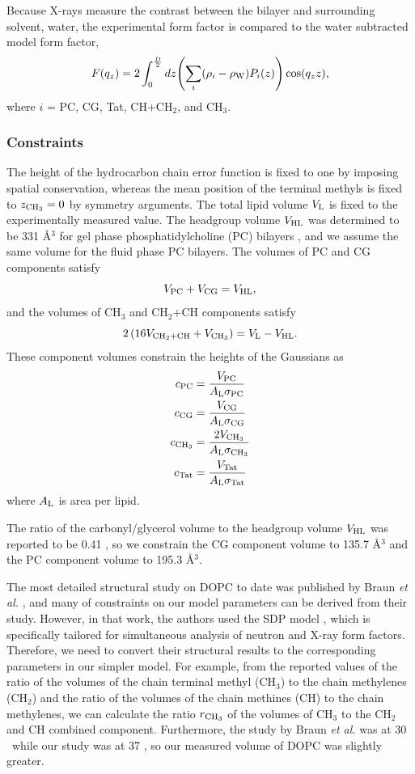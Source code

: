 Because X-rays measure the contrast between the bilayer and surrounding solvent, 
water, the experimental form factor is compared to the water subtracted model
form factor,
\begin{equation}
  F(q_z) = 2\int_0^{\frac{D}{2}} \mathop{dz} \mathopen{}\left( 
    \sum_i(\rho_i-\rho_\textrm{W})P_i(z)
   \right)\mathclose{} \cos(q_zz),
\end{equation}
where $i$ = PC, CG, Tat, CH+CH$_2$, and CH$_3$.

\subsubsection{Constraints}
The height of the hydrocarbon chain error function is fixed to one by imposing
spatial conservation, whereas the mean position of the terminal methyls is
fixed to $z_{\textrm{CH}_3}=0$ by symmetry arguments. The total lipid volume
$V_\textrm{L}$ is fixed to the experimentally measured value. 
The headgroup volume $V_\textrm{HL}$ was determined to be 331 \AA$^3$ for 
gel phase phosphatidylcholine (PC) bilayers \cite{Tristram-Nagle02},
and we assume the same volume for the fluid phase PC bilayers.
The volumes of PC and CG components satisfy
\begin{equation}
  V_\textrm{PC} + V_\textrm{CG} = V_\textrm{HL},
\end{equation}
and the volumes of CH$_3$ and CH$_2$+CH components satisfy
\begin{equation}
  2\left(16V_{\textrm{CH}_2+\textrm{CH}} + V_{\textrm{CH}_3}\right) = V_\textrm{L}-V_\textrm{HL}.
\end{equation}
These component volumes constrain the heights of the Gaussians as
\begin{align}
  c_\textrm{PC} &= \frac{V_\textrm{PC}}{A_\textrm{L}\sigma_\textrm{PC}} \\
  c_\textrm{CG} &= \frac{V_\textrm{CG}}{A_\textrm{L}\sigma_\textrm{CG}} \\
  c_{\textrm{CH}_3} &= \frac{2V_{\textrm{CH}_3}}{A_\textrm{L}\sigma_{\textrm{CH}_3}} \\
  c_\textrm{Tat} &= \frac{V_\textrm{Tat}}{A_\textrm{L}\sigma_\textrm{Tat}}
\end{align}
where $A_\textrm{L}$ is area per lipid.

The ratio of 
the carbonyl/glycerol volume to the headgroup volume $V_\textrm{HL}$ was
reported to be 0.41 \cite{Braun13}, so we constrain the CG
component volume to 135.7 \AA$^3$ and the PC component volume to 
195.3 \AA$^3$. 

The most detailed structural study on DOPC to date was published 
by Braun \textit{et al.} \cite{Braun13}, 
and many of constraints on our model parameters can be derived
from their study. However, in that work, the authors used the 
SDP model \cite{Kucerka08}, which is specifically tailored for
simultaneous analysis of neutron and X-ray form factors. 
Therefore, we need to convert their structural results to the 
corresponding parameters in our simpler model. For example, 
from the reported values of the ratio of the volumes of the chain terminal
methyl (CH$_3$) to the chain methylenes (CH$_2$) and the ratio of 
the volumes of the chain methines (CH) to the chain methylenes, we can
calculate the ratio $r_{\textrm{CH}_3}$ of the volumes of CH$_3$ to the CH$_2$ and
CH combined component.  
Furthermore, the study by Braun \textit{et al.} was at 30 \textcelsius\
while our study was at 37 \textcelsius, so our
measured volume of DOPC was slightly greater.

